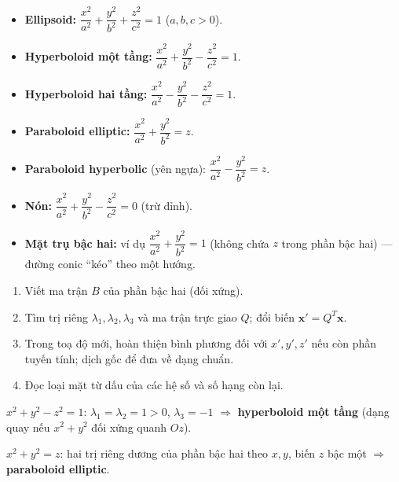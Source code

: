 \documentclass[12pt,a4paper]{article}
\begin{document}
\begin{tinhchat}[title={Một số dạng chuẩn thường gặp}]
\begin{itemize}
  \item \textbf{Ellipsoid:} $\dfrac{x^2}{a^2} + \dfrac{y^2}{b^2} + \dfrac{z^2}{c^2} = 1$ \quad ($a,b,c > 0$).
  \item \textbf{Hyperboloid một tầng:} $\dfrac{x^2}{a^2} + \dfrac{y^2}{b^2} - \dfrac{z^2}{c^2} = 1$.
  \item \textbf{Hyperboloid hai tầng:} $\dfrac{x^2}{a^2} - \dfrac{y^2}{b^2} - \dfrac{z^2}{c^2} = 1$.
  \item \textbf{Paraboloid elliptic:} $\dfrac{x^2}{a^2} + \dfrac{y^2}{b^2} = z$.
  \item \textbf{Paraboloid hyperbolic} (yên ngựa): $\dfrac{x^2}{a^2} - \dfrac{y^2}{b^2} = z$.
  \item \textbf{Nón:} $\dfrac{x^2}{a^2} + \dfrac{y^2}{b^2} - \dfrac{z^2}{c^2} = 0$ (trừ đỉnh).
  \item \textbf{Mặt trụ bậc hai:} ví dụ $\dfrac{x^2}{a^2} + \dfrac{y^2}{b^2} = 1$ (không chứa $z$ trong phần bậc hai) --- đường conic ``kéo'' theo một hướng.
\end{itemize}
\end{tinhchat}

\begin{phuongphap}[title={Quy trình nhận dạng mặt bậc hai (ôn tập ĐSTT)}]
\begin{enumerate}
  \item Viết ma trận $B$ của phần bậc hai (đối xứng).
  \item Tìm trị riêng $\lambda_1, \lambda_2, \lambda_3$ và ma trận trực giao $Q$; đổi biến $\mathbf{x}' = Q^T \mathbf{x}$.
  \item Trong toạ độ mới, hoàn thiện bình phương đối với $x', y', z'$ nếu còn phần tuyến tính; dịch gốc để đưa về dạng chuẩn.
  \item Đọc loại mặt từ dấu của các hệ số và số hạng còn lại.
\end{enumerate}
\end{phuongphap}

\begin{vidu}[title={Mặt bậc hai đơn giản}]
$x^2 + y^2 - z^2 = 1$: $\lambda_1 = \lambda_2 = 1 > 0$, $\lambda_3 = -1$ $\Rightarrow$ \textbf{hyperboloid một tầng} (dạng quay nếu $x^2 + y^2$ đối xứng quanh $Oz$).

$x^2 + y^2 = z$: hai trị riêng dương của phần bậc hai theo $x,y$, biến $z$ bậc một $\Rightarrow$ \textbf{paraboloid elliptic}.
\end{vidu}
\end{document}
